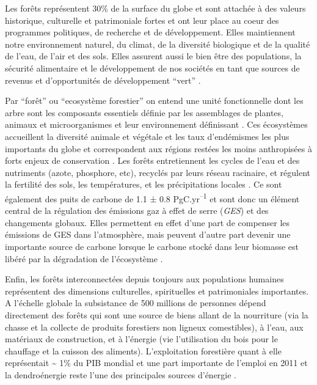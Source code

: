 \documentclass[
  11pt,
  french,
  A4paper,
  extrafontsizes,onecolumn,openright
  ]{memoir}
\begin{document}
Les forêts représentent 30\% de la surface du globe et sont attachée à
des valeurs historique, culturelle et patrimoniale fortes et ont leur
place au coeur des programmes politiques, de recherche et de
développement. Elles maintiennent notre environnement naturel, du
climat, de la diversité biologique et de la qualité de l'eau, de l'air
et des sols. Elles assurent aussi le bien être des populations, la
sécurité alimentaire et le développement de nos sociétés en tant que
sources de revenus et d'opportunités de développement ``vert''
\autocites{FRA2015}{Tilman2014}.

Par ``forêt'' ou ``ecosystème forestier'' on entend une unité
fonctionnelle dont les arbre sont les composants essentiels définie par
les assemblages de plantes, animaux et microorganismes et leur
environnement définissant \autocite{FRA2000}. Ces écosystèmes
accueillent la diversité animale et végétale et les taux d'endémismes
les plus importants du globe et correspondent aux régions restées les
moins anthropisées à forts enjeux de conservation
\autocites{Myers2000}{Mittermeier2003}. Les forêts entretiennent les
cycles de l'eau et des nutriments (azote, phosphore, etc), recyclés par
leurs réseau racinaire, et régulent la fertilité des sols, les
températures, et les précipitations locales
\autocites{Malhi2008}{Isbell2017}. Ce sont également des puits de
carbone de 1.1 ± 0.8 PgC.yr\textsuperscript{--1} et sont donc un élément
central de la régulation des émissions gaz à effet de serre (\emph{GES})
et des changements globaux. Elles permettent en effet d'une part de
compenser les émissions de GES dans l'atmosphère, mais peuvent d'autre
part devenir une importante source de carbone lorsque le carbone stocké
dans leur biomasse est libéré par la dégradation de l'écosystème
\autocites{Pan2011}{Roy2017}.

Enfin, les forêts interconnectées depuis toujours aux populations
humaines représentent des dimensions culturelles, spirituelles et
patrimoniales importantes. A l'échelle globale la subsistance de 500
millions de personnes dépend directement des forêts qui sont une source
de biens allant de la nourriture (via la chasse et la collecte de
produits forestiers non ligneux comestibles), à l'eau, aux matériaux de
construction, et à l'énergie (vie l'utilisation du bois pour le
chauffage et la cuisson des aliments). L'exploitation forestière quant à
elle représentait \textasciitilde{} 1\% du PIB mondial et une part
importante de l'emploi en 2011 et la dendroénergie reste l'une des
principales sources d'énergie \autocites{CBDdiversity2011}{FAO2014}.
\end{document}
